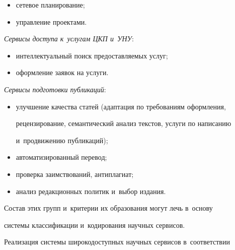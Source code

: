     \begin{itemize}

\item сетевое планирование;\\[-13.5pt]

\item управление проектами.

\end{itemize}



    \textit{Сервисы доступа к~услугам ЦКП и~УНУ}: 

    \begin{itemize}

\item интеллектуальный поиск предоставляемых услуг;\\[-13.5pt]

\item оформление заявок на услуги.

\end{itemize}



    \textit{Сервисы подготовки публикаций}:

    \begin{itemize}

\item улучшение качества статей (адап\-та\-ция по требованиям оформления, 

рецензирование, семантический анализ текстов, услуги по написанию 

и~продвижению публикаций);\\[-13.5pt]

\item автоматизированный перевод;

\item проверка заимствований, антиплагиат;\\[-13.5pt]

\item анализ редакционных политик и~выбор издания.

\end{itemize}



    Состав этих групп и~критерии их образования могут лечь в~основу 

системы классификации и~кодирования научных сервисов.

    

    Реализация системы широкодоступных научных сервисов в~соответствии 

